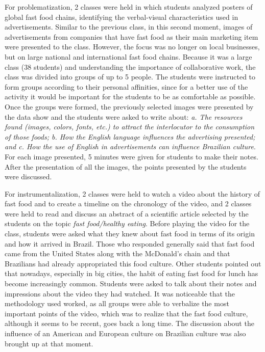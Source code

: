 \documentclass[english]{textolivre}
\begin{document}
 For problematization, 2 classes were held in which students analyzed posters of global fast food chains, identifying the verbal-visual characteristics used in advertisements. Similar to the previous class, in this second moment, images of advertisements from companies that have fast food as their main marketing item were presented to the class. However, the focus was no longer on local businesses, but on large national and international fast food chains. Because it was a large class (38 students) and understanding the importance of collaborative work, the class was divided into groups of up to 5 people. The students were instructed to form groups according to their personal affinities, since for a better use of the activity it would be important for the students to be as comfortable as possible. Once the groups were formed, the previously selected images were presented by the data show and the students were asked to write about: \emph{a. The resources found (images, colors, fonts, etc.) to attract the interlocutor to the consumption of those foods; b. How the English language influences the advertising presented; and c. How the use of English in advertisements can influence Brazilian culture}. For each image presented, 5 minutes were given for students to make their notes. After the presentation of all the images, the points presented by the students were discussed.

For instrumentalization, 2 classes were held to watch a video about the history of fast food and to create a timeline on the chronology of the video, and 2 classes were held to read and discuss an abstract of a scientific article selected by the students on the topic \emph{fast food/healthy eating}. Before playing the video for the class, students were asked what they knew about fast food in terms of its origin and how it arrived in Brazil. Those who responded generally said that fast food came from the United States along with the McDonald’s chain and that Brazilians had already appropriated this food culture. Other students pointed out that nowadays, especially in big cities, the habit of eating fast food for lunch has become increasingly common. Students were asked to talk about their notes and impressions about the video they had watched. It was noticeable that the methodology used worked, as all groups were able to verbalize the most important points of the video, which was to realize that the fast food culture, although it seems to be recent, goes back a long time. The discussion about the influence of an American and European culture on Brazilian culture was also brought up at that moment.
\end{document}
